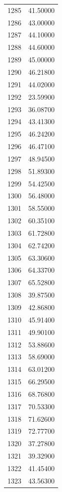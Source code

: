 \documentclass[
  letterpaper,
  DIV=11,
  numbers=noendperiod]{scrreprt}
\begin{document}
\begin{tcolorbox}
\begin{tabular}{lr}
1285 &         41.50000 \\
1286 &         43.00000 \\
1287 &         44.10000 \\
1288 &         44.60000 \\
1289 &         45.00000 \\
1290 &         46.21800 \\
1291 &         44.02000 \\
1292 &         23.59900 \\
1293 &         36.08700 \\
1294 &         43.41300 \\
1295 &         46.24200 \\
1296 &         46.47100 \\
1297 &         48.94500 \\
1298 &         51.89300 \\
1299 &         54.42500 \\
1300 &         56.48000 \\
1301 &         58.55000 \\
1302 &         60.35100 \\
1303 &         61.72800 \\
1304 &         62.74200 \\
1305 &         63.30600 \\
1306 &         64.33700 \\
1307 &         65.52800 \\
1308 &         39.87500 \\
1309 &         42.86800 \\
1310 &         45.91400 \\
1311 &         49.90100 \\
1312 &         53.88600 \\
1313 &         58.69000 \\
1314 &         63.01200 \\
1315 &         66.29500 \\
1316 &         68.76800 \\
1317 &         70.53300 \\
1318 &         71.62600 \\
1319 &         72.77700 \\
1320 &         37.27800 \\
1321 &         39.32900 \\
1322 &         41.45400 \\
1323 &         43.56300 \\

\end{tabular}
\end{tcolorbox}
\end{document}

